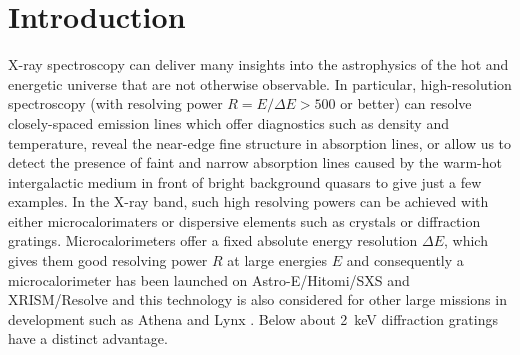 \documentclass[linenumbers]{aastex631}
\begin{document}


\section{Introduction} \label{sec:intro}
X-ray spectroscopy can deliver many insights into the astrophysics of the hot and energetic universe that are not otherwise observable. In particular, high-resolution spectroscopy (with resolving power $R=E/\Delta E> 500$ or better) can resolve closely-spaced emission lines which offer diagnostics such as density and temperature, reveal the near-edge fine structure in absorption lines, or allow us to detect the presence of faint and narrow absorption lines caused by the warm-hot intergalactic medium in front of bright background quasars to give just a few examples. In the X-ray band, such high resolving powers can be achieved with either microcalorimaters or dispersive elements such as crystals or diffraction gratings. Microcalorimeters offer a fixed absolute energy resolution $\Delta E$, which gives them good resolving power $R$ at large energies $E$ and consequently a microcalorimeter has been launched on Astro-E/Hitomi/SXS \citep{2014SPIE.9144E..2AM} and XRISM/Resolve \citep{2018JATIS...4a1214K} and this technology is also considered for other large missions in development such as Athena \citep{2014SPIE.9144E..2LR} and Lynx \citep{2019JATIS...5b1017B}. Below about 2~keV diffraction gratings have a distinct advantage.
\end{document}
